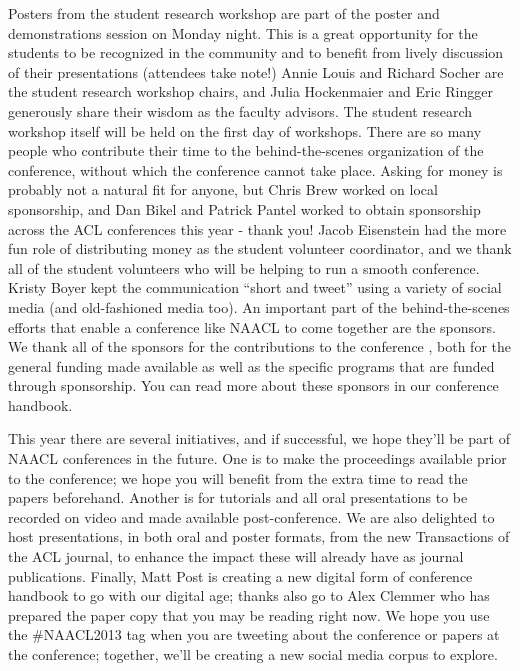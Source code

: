 \begin{large}
Posters from the student research workshop are part of the poster and demonstrations session on Monday night. This is a great opportunity for the students to be recognized in the community and to benefit from lively discussion of their presentations (attendees take note!) Annie Louis and Richard Socher are the student research workshop chairs, and Julia Hockenmaier and Eric Ringger generously share their wisdom as the faculty advisors.  The student research workshop itself will be held on the first day of workshops.
There are so many people who contribute their time to the behind-the-scenes organization of the conference, without which the conference cannot take place. Asking for money is probably not a natural fit for anyone, but Chris Brew worked on local sponsorship, and Dan Bikel and Patrick Pantel worked to obtain sponsorship across the ACL conferences this year - thank you!  Jacob Eisenstein had the more fun role of distributing money as the student volunteer coordinator, and we thank all of the student volunteers who will be helping to run a smooth conference.  Kristy Boyer kept the communication ``short and tweet'' using a variety of social media (and old-fashioned media too).
An important part of the behind-the-scenes efforts that enable a conference like NAACL to come together are the sponsors. We thank all of the sponsors for the contributions to the conference , both for the general funding made available as well as the specific programs that are funded through sponsorship.  You can read more about these sponsors in our conference handbook.

This year there are several initiatives, and if successful, we hope  they’ll be part of NAACL conferences in the future. One is to make the proceedings available prior to the conference; we hope you will benefit from the extra time to read the papers beforehand.  Another is for tutorials and all oral presentations to be recorded on video and made available post-conference. We are also delighted to host presentations, in both oral and poster formats, from the new Transactions of the ACL journal, to enhance the impact these will already have as journal publications. Finally, Matt Post is creating a new digital form of conference handbook to go with our digital age; thanks also go to  Alex Clemmer who  has prepared the paper copy that you may be reading right now.  We hope you use the \#NAACL2013 tag when you are tweeting about the conference or papers at the conference; together, we'll be creating a new social media corpus to explore.


\end{large}
